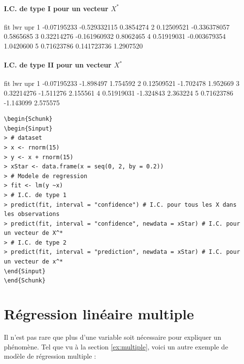 \documentclass[11pt,french]{report}
\begin{document}
\subsubsection*{I.C. de type I pour un vecteur $X^*$}
\begin{Schunk}
\begin{Soutput}
          fit          lwr       upr
1 -0.07195233 -0.529332115 0.3854274
2  0.12509521 -0.336378057 0.5865685
3  0.32214276 -0.161960932 0.8062465
4  0.51919031 -0.003679354 1.0420600
5  0.71623786  0.141723736 1.2907520
\end{Soutput}
\end{Schunk}

\subsubsection*{I.C. de type II pour un vecteur $X^*$}
\begin{Schunk}
\begin{Soutput}
          fit       lwr      upr
1 -0.07195233 -1.898497 1.754592
2  0.12509521 -1.702478 1.952669
3  0.32214276 -1.511276 2.155561
4  0.51919031 -1.324843 2.363224
5  0.71623786 -1.143099 2.575575
\end{Soutput}
\end{Schunk}

\begin{lstlisting}[linerange=\\begin\{Sinput\}-\\end\{Sinput\},includerangemarker=false, caption = Code source en R pour l'exemple]
\begin{Schunk}
\begin{Sinput}
> # dataset
> x <- rnorm(15)
> y <- x + rnorm(15)
> xStar <- data.frame(x = seq(0, 2, by = 0.2)) 
> # Modele de regression
> fit <- lm(y ~x)
> # I.C. de type 1
> predict(fit, interval = "confidence") # I.C. pour tous les X dans les observations
> predict(fit, interval = "confidence", newdata = xStar) # I.C. pour un vecteur de X^*
> # I.C. de type 2
> predict(fit, interval = "prediction", newdata = xStar) # I.C. pour un vecteur de x^*
\end{Sinput}
\end{Schunk}
\end{lstlisting}
\bigskip

\chapter{Régression linéaire multiple}
Il n'est pas rare que plus d'une variable soit nécessaire pour expliquer un phénomène. 
Tel que vu à la section \ref{ex:multiple}, voici un autre exemple de modèle de régression multiple :
\end{document}
